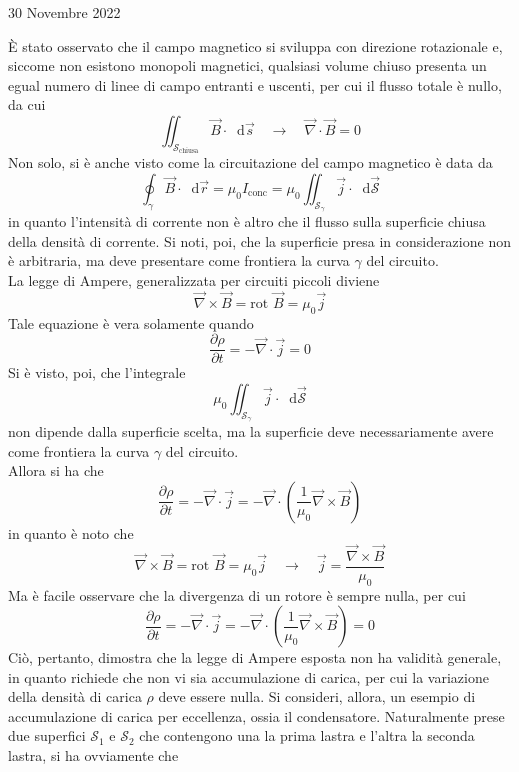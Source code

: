 \documentclass[a4paper]{extarticle}
\newcommand\dif{\mathop{}\!\mathrm{d}}
\begin{document}
\newpage
\noindent
\begin{center}
  30 Novembre 2022
\end{center}
È stato osservato che il campo magnetico si sviluppa con direzione rotazionale e, siccome non esistono monopoli magnetici, qualsiasi volume chiuso presenta un egual numero di linee di campo entranti e uscenti, per cui il flusso totale è nullo, da cui
\[\iint_{\mathcal{S}_\text{chiusa}} \vec B \cdot \dif \vec s \hspace{1em} \rightarrow \hspace{1em} \vec \nabla \cdot \vec B = 0\]
Non solo, si è anche visto come la circuitazione del campo magnetico è data da
\[\oint_\gamma \vec B \cdot \dif \vec r = \mu_0 I_\text{conc} = \mu_0 \iint_{\mathcal{S}_\gamma} \vec j \cdot \dif \vec{\mathcal{S}}\]
in quanto l'intensità di corrente non è altro che il flusso sulla superficie chiusa della densità di corrente. Si noti, poi, che la superficie presa in considerazione non è arbitraria, ma deve presentare come frontiera la curva $\gamma$ del circuito.\\
La legge di Ampere, generalizzata per circuiti piccoli diviene
\[\vec \nabla \times \vec B = \text{rot } \vec B = \mu_0 \vec j\]
Tale equazione è vera solamente quando
\[\dfrac{\partial \rho}{\partial t} = - \vec \nabla \cdot \vec j = 0\]
Si è visto, poi, che l'integrale 
\[\mu_0 \iint_{\mathcal{S}_\gamma} \vec j \cdot \dif \vec{\mathcal{S}}\]
non dipende dalla superficie scelta, ma la superficie deve necessariamente avere come frontiera la curva $\gamma$ del circuito.\\
Allora si ha che
\[\dfrac{\partial \rho}{\partial t} = - \vec \nabla \cdot \vec j = - \vec \nabla \cdot \left(\dfrac{1}{\mu_0} \vec \nabla \times \vec B\right)\]
in quanto è noto che
\[\vec \nabla \times \vec B = \text{rot } \vec B = \mu_0 \vec j \hspace{1em} \rightarrow \hspace{1em} \vec j = \dfrac{\vec \nabla \times \vec B}{\mu_0}\]
Ma è facile osservare che la divergenza di un rotore è sempre nulla, per cui
\[\dfrac{\partial \rho}{\partial t} = - \vec \nabla \cdot \vec j = - \vec \nabla \cdot \left(\dfrac{1}{\mu_0} \vec \nabla \times \vec B\right) = 0\]
Ciò, pertanto, dimostra che la legge di Ampere esposta non ha validità generale, in quanto richiede che non vi sia accumulazione di carica, per cui la variazione della densità di carica $\rho$ deve essere nulla. Si consideri, allora, un esempio di accumulazione di carica per eccellenza, ossia il condensatore. Naturalmente prese due superfici $\mathcal{S}_1$ e $\mathcal{S}_2$ che contengono una la prima lastra e l'altra la seconda lastra, si ha ovviamente che
\end{document}
